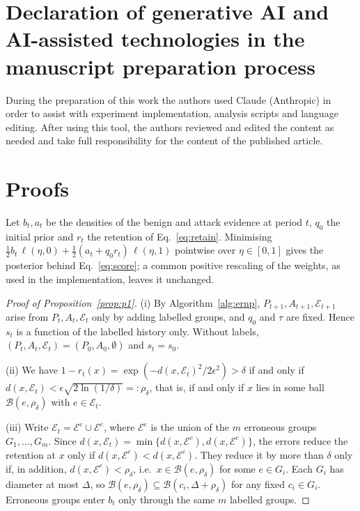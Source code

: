 \documentclass[a4paper,fleqn]{cas-dc}
\newcommand{\E}{\mathcal{E}}
\begin{document}
\section*{Declaration of generative AI and AI-assisted technologies in the manuscript preparation process}
During the preparation of this work the authors used Claude (Anthropic) in order to assist with experiment implementation, analysis scripts and language editing. After using this tool, the authors reviewed and edited the content as needed and take full responsibility for the content of the published article.

\appendix
\section{Proofs}
\label{app:proofs}
Let $b_t,a_t$ be the densities of the benign and attack evidence at period $t$, $q_0$ the initial prior and $r_t$ the retention of Eq.~\eqref{eq:retain}. Minimising $\tfrac12 b_t\,\ell(\eta,0)+\tfrac12(a_t+q_0r_t)\,\ell(\eta,1)$ pointwise over $\eta\in[0,1]$ gives the posterior behind Eq.~\eqref{eq:score}; a common positive rescaling of the weights, as used in the implementation, leaves it unchanged.

\begin{proof}[Proof of Proposition~\ref{prop:p1}]
(i) By Algorithm~\ref{alg:ernp}, $P_{t+1},A_{t+1},\E_{t+1}$ arise from $P_t,A_t,\E_t$ only by adding labelled groups, and $q_0$ and $\tau$ are fixed. Hence $s_t$ is a function of the labelled history only. Without labels, $(P_t,A_t,\E_t)=(P_0,A_0,\emptyset)$ and $s_t=s_0$.

(ii) We have $1-r_t(x)=\exp(-d(x,\E_t)^2/2\epsilon^2)>\delta$ if and only if $d(x,\E_t)<\epsilon\sqrt{2\ln(1/\delta)}=:\rho_\delta$, that is, if and only if $x$ lies in some ball $\mathcal B(e,\rho_\delta)$ with $e\in\E_t$.

(iii) Write $\E_t=\E^{c}\cup\E^{e}$, where $\E^{e}$ is the union of the $m$ erroneous groups $G_1,\dots,G_m$. Since $d(x,\E_t)=\min\{d(x,\E^c),d(x,\E^e)\}$, the errors reduce the retention at $x$ only if $d(x,\E^e)<d(x,\E^c)$. They reduce it by more than $\delta$ only if, in addition, $d(x,\E^e)<\rho_\delta$, i.e.\ $x\in\mathcal B(e,\rho_\delta)$ for some $e\in G_i$. Each $G_i$ has diameter at most $\Delta$, so $\mathcal B(e,\rho_\delta)\subseteq\mathcal B(c_i,\Delta+\rho_\delta)$ for any fixed $c_i\in G_i$. Erroneous groups enter $b_t$ only through the same $m$ labelled groups.
\end{proof}
\end{document}
